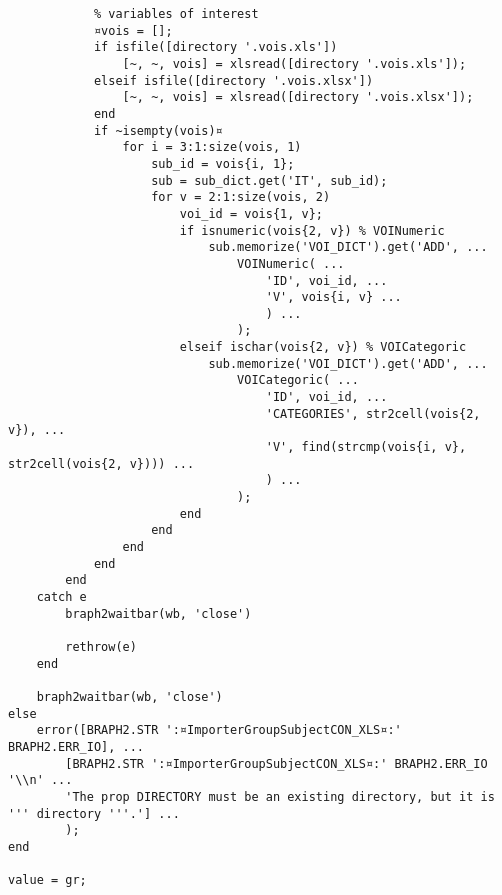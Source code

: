 \documentclass{tufte-handout}
\begin{document}
\begin{lstlisting}
            % variables of interest
            ¤vois = [];
            if isfile([directory '.vois.xls'])
                [~, ~, vois] = xlsread([directory '.vois.xls']);
            elseif isfile([directory '.vois.xlsx'])
                [~, ~, vois] = xlsread([directory '.vois.xlsx']);
            end
            if ~isempty(vois)¤
                for i = 3:1:size(vois, 1)
                    sub_id = vois{i, 1};
                    sub = sub_dict.get('IT', sub_id);
                    for v = 2:1:size(vois, 2)
                        voi_id = vois{1, v};
                        if isnumeric(vois{2, v}) % VOINumeric
                            sub.memorize('VOI_DICT').get('ADD', ...
                                VOINumeric( ...
                                    'ID', voi_id, ...
                                    'V', vois{i, v} ...
                                    ) ...
                                );
                        elseif ischar(vois{2, v}) % VOICategoric
                            sub.memorize('VOI_DICT').get('ADD', ...
                                VOICategoric( ...
                                    'ID', voi_id, ...
                                    'CATEGORIES', str2cell(vois{2, v}), ...
                                    'V', find(strcmp(vois{i, v}, str2cell(vois{2, v}))) ...
                                    ) ...
                                );
                        end                        
                    end
                end
            end
        end
    catch e
        braph2waitbar(wb, 'close')
        
        rethrow(e)
    end
    
    braph2waitbar(wb, 'close')
else
    error([BRAPH2.STR ':¤ImporterGroupSubjectCON_XLS¤:' BRAPH2.ERR_IO], ...
        [BRAPH2.STR ':¤ImporterGroupSubjectCON_XLS¤:' BRAPH2.ERR_IO '\\n' ...
        'The prop DIRECTORY must be an existing directory, but it is ''' directory '''.'] ...
        );
end

value = gr;
\end{lstlisting}
\end{document}
